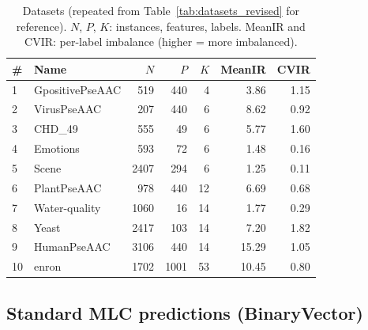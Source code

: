\documentclass[11pt]{article}
\begin{document}
\begin{table}[!htbp]
\centering
\begin{tabular}{l|l|r|r|r|r|r}
\hline
\# & Name & $N$ & $P$ & $K$ & MeanIR & CVIR \\
\hline
1  & GpositivePseAAC & 519  & 440  & 4  & 3.86  & 1.15 \\
2  & VirusPseAAC     & 207  & 440  & 6  & 8.62  & 0.92 \\
3  & CHD\_49         & 555  & 49   & 6  & 5.77  & 1.60 \\
4  & Emotions        & 593  & 72   & 6  & 1.48  & 0.16 \\
5  & Scene           & 2407 & 294  & 6  & 1.25  & 0.11 \\
6  & PlantPseAAC     & 978  & 440  & 12 & 6.69  & 0.68 \\
7  & Water-quality   & 1060 & 16   & 14 & 1.77  & 0.29 \\
8  & Yeast           & 2417 & 103  & 14 & 7.20  & 1.82 \\
9  & HumanPseAAC     & 3106 & 440  & 14 & 15.29 & 1.05 \\
10 & enron           & 1702 & 1001 & 53 & 10.45 & 0.80 \\
\hline
\end{tabular}
\caption{Datasets (repeated from Table~\ref{tab:datasets_revised} for reference). $N$, $P$, $K$: instances, features, labels. MeanIR and CVIR: per-label imbalance (higher = more imbalanced).}
\label{tab:datasets_revised_paper}
\end{table}

\FloatBarrier

\subsection{Standard MLC predictions (BinaryVector)}
\end{document}
